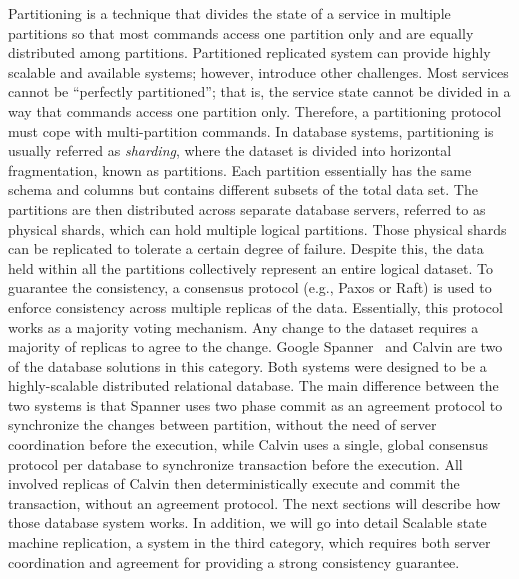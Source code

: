 Partitioning is a technique that divides the state of a service in multiple
partitions so that most commands access one partition only and are equally
distributed among partitions. Partitioned replicated system can provide highly
scalable and available systems; however, introduce other challenges. Most
services cannot be ``perfectly partitioned''; that is, the service state cannot
be divided in a way that commands access one partition only. Therefore, a
partitioning protocol must cope with multi-partition commands. In database
systems, partitioning is usually referred as \emph{sharding}, where the dataset
is divided into horizontal fragmentation, known as partitions. Each partition
essentially has the same schema and columns but contains different subsets of
the total data set. The partitions are then distributed across separate database
servers, referred to as physical shards, which can hold multiple logical
partitions. Those physical shards can be replicated to tolerate a certain degree
of failure. Despite this, the data held within all the partitions collectively
represent an entire logical dataset. To guarantee the consistency, a consensus
protocol (e.g., Paxos or Raft) is used to enforce consistency across multiple
replicas of the data. Essentially, this protocol works as a majority voting
mechanism. Any change to the dataset requires a majority of replicas to agree to
the change. Google Spanner~\cite{corbett2013spanner} and Calvin \cite{calvin}
are two of the database solutions in this category. Both systems were designed
to be a highly-scalable distributed relational database. The main difference
between the two systems is that Spanner uses two phase commit as an agreement
protocol to synchronize the changes between partition, without the need of
server coordination before the execution, while Calvin uses a single, global
consensus protocol per database to synchronize transaction before the execution.
All involved replicas of Calvin then deterministically execute and commit the
transaction, without an agreement protocol. The next sections will describe how
those database system works. In addition, we will go into detail Scalable state
machine replication, a system in the third category, which requires both server
coordination and agreement for providing a strong consistency guarantee.





